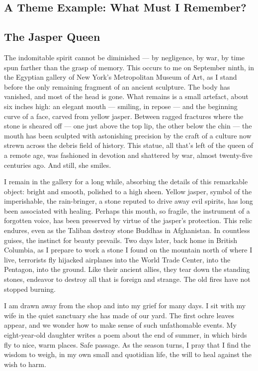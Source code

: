 \documentclass[letterpaper,oneside]{memoir}
\begin{document}
\begin{description}
\section{A Theme Example: What Must I Remember?}
\subsection{The Jasper Queen}
The indomitable spirit cannot be diminished --- by negligence, by war, by time spun farther than the grasp of memory. This occurs to me on September ninth, in the Egyptian gallery of New York's Metropolitan Museum of Art, as I stand before the only remaining fragment of an ancient sculpture. The body has vanished, and most of the head is gone. What remains is a small artefact, about six inches high: an elegant mouth --- smiling, in repose --- and the beginning curve of a face, carved from yellow jasper. Between ragged fractures where the stone is sheared off --- one just above the top lip, the other below the chin --- the mouth has been sculpted with astonishing precision by the craft of a culture now strewn across the debris field of history. This statue, all that's left of the queen of a remote age, was fashioned in devotion and shattered by war, almost twenty-five centuries ago. And still, she smiles.

I remain in the gallery for a long while, absorbing the details of this remarkable object: bright and smooth, polished to a high sheen. Yellow jasper, symbol of the imperishable, the rain-bringer, a stone reputed to drive away evil spirits, has long been associated with healing. Perhaps this mouth, so fragile, the instrument of a forgotten voice, has been preserved by virtue of the jasper's protection. This relic endures, even as the Taliban destroy stone Buddhas in Afghanistan. In countless guises, the instinct for beauty prevails.
Two days later, back home in British Columbia, as I prepare to work a stone I found on the mountain north of where I live, terrorists fly hijacked airplanes into the World Trade Center, into the Pentagon, into the ground. Like their ancient allies, they tear down the standing stones, endeavor to destroy all that is foreign and strange. The old fires have not stopped burning.

I am drawn away from the shop and into my grief for many days. I sit with my wife in the quiet sanctuary she has made of our yard. The first ochre leaves appear, and we wonder how to make sense of such unfathomable events. My eight-year-old daughter writes a poem about the end of summer, in which birds fly to nice, warm places. Safe passage. As the season turns, I pray that I find the wisdom to weigh, in my own small and quotidian life, the will to heal against the wish to harm.


\end{description}
\end{document}
